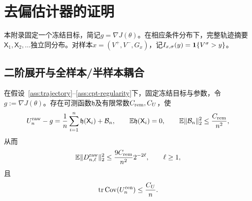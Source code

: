 \section{去偏估计器的证明}\label{app:estimator}

本附录固定一个冻结目标，简记$g=\nabla J(\theta)$。在相应条件分布下，完整轨迹摘要$\mathsf X_1,\mathsf X_2,\ldots$独立同分布。对样本$x=(V^+,V^-,G_x)$，记$I_{x,\sigma}(y)=\mathbf 1\{V^\sigma>y\}$。

\subsection{二阶展开与全样本/半样本耦合}

\begin{lemma}\label{lem:level-cancellation}
在假设~\ref{ass:trajectory}--\ref{ass:cpt-regularity}下，固定冻结目标与参数，令$g:=\nabla J(\theta)$。存在可测函数$\mathfrak h$及有限常数$C_{\rm rem},C_U$，使
\begin{equation}\label{eq:loo-expansion}
 U_n^{\rm raw}-g
 =\frac1n\sum_{i=1}^{n}\mathfrak h(\mathsf X_i)+\mathcal B_n,
 \qquad
 \mathbb E\mathfrak h(\mathsf X_i)=0,
 \qquad
 \mathbb E\lVert\mathcal B_n\rVert_2^2\le\frac{C_{\rm rem}}{n^2},
\end{equation}
从而
\begin{equation}\label{eq:level-second-moment}
 \mathbb E\lVert D_{n,\ell}^{\rm raw}\rVert_2^2
 \le\frac{9C_{\rm rem}}{n^2}2^{-2\ell},
 \qquad \ell\ge1,
\end{equation}
且
\begin{equation}\label{eq:centered-loo-variance}
 \operatorname{tr}\operatorname{Cov}(U_n^{\rm cen})\le\frac{C_U}{n}.
\end{equation}
\end{lemma}

